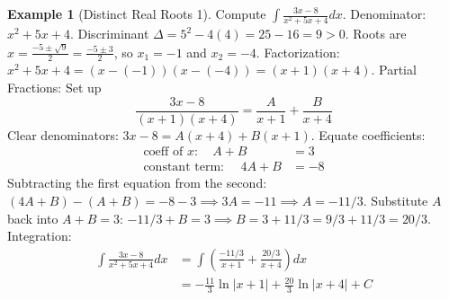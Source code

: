 \documentclass[11pt]{article}
\theoremstyle{plain}
\theoremstyle{definition}
\newtheorem{example}[theorem]{Example}
\theoremstyle{remark}
\newcommand{\abs}[1]{\left|#1\right|}
\begin{document}
\begin{example}[Distinct Real Roots 1]
Compute $\int \frac{3x-8}{x^2+5x+4} dx$.
Denominator: $x^2+5x+4$. Discriminant $\Delta = 5^2 - 4(4) = 25-16=9 > 0$. Roots are $x = \frac{-5 \pm \sqrt{9}}{2} = \frac{-5 \pm 3}{2}$, so $x_1 = -1$ and $x_2 = -4$.
Factorization: $x^2+5x+4 = (x-(-1))(x-(-4)) = (x+1)(x+4)$.
Partial Fractions: Set up
\[ \frac{3x-8}{(x+1)(x+4)} = \frac{A}{x+1} + \frac{B}{x+4} \]
Clear denominators: $3x-8 = A(x+4) + B(x+1)$.
Equate coefficients:
\begin{align*} \text{coeff of } x: \quad A+B &= 3 \\ \text{constant term: } \quad 4A+B &= -8 \end{align*}
Subtracting the first equation from the second: $(4A+B)-(A+B) = -8-3 \implies 3A = -11 \implies A = -11/3$.
Substitute $A$ back into $A+B=3$: $-11/3 + B = 3 \implies B = 3 + 11/3 = 9/3 + 11/3 = 20/3$.
Integration:
\begin{align*} \int \frac{3x-8}{x^2+5x+4} dx &= \int \left( \frac{-11/3}{x+1} + \frac{20/3}{x+4} \right) dx \\ &= -\frac{11}{3} \ln\abs{x+1} + \frac{20}{3} \ln\abs{x+4} + C \end{align*}
\end{example}
\end{document}
